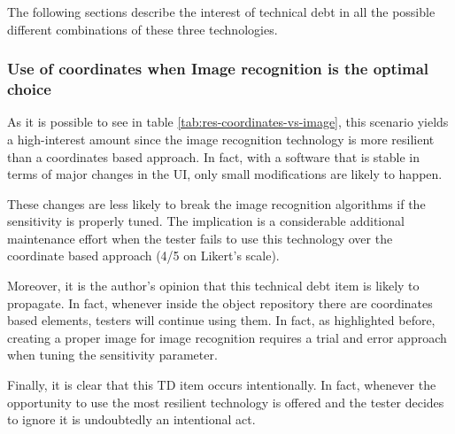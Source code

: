 
The following sections describe the interest of technical debt in all the possible different combinations of these three technologies.

\subsubsection{Use of coordinates when Image recognition is the optimal choice} \label{sec:dis-coordinates-vs-image}

As it is possible to see in table  \ref{tab:res-coordinates-vs-image}, this scenario yields a high-interest amount since the image recognition technology is more resilient than a coordinates based approach. In fact, with a software that is stable in terms of major changes in the UI, only small modifications are likely to happen.

 \label{sec:disc-rq3-wrong-technique-1}
These changes are less likely to break the image recognition algorithms if the sensitivity is properly tuned. The implication is a considerable additional maintenance effort when the tester fails to use this technology over the coordinate based approach (4/5 on Likert's scale).

Moreover, it is the author's opinion that this technical debt item is likely to propagate. In fact, whenever inside the object repository there are coordinates based elements, testers will continue using them. In fact, as highlighted before, creating a proper image for image recognition requires a trial and error approach when tuning the sensitivity parameter.

Finally, it is clear that this TD item occurs intentionally. In fact, whenever the opportunity to use the most resilient technology is offered and the tester decides to ignore it is undoubtedly an intentional act.


